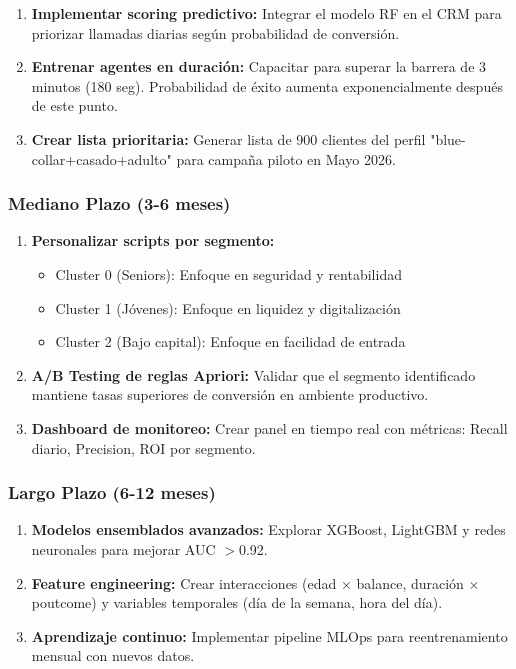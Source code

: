 \documentclass[12pt,letterpaper]{article}
\begin{document}
\begin{enumerate}
    \item \textbf{Implementar scoring predictivo:} Integrar el modelo RF en el CRM para priorizar llamadas diarias según probabilidad de conversión.
    
    \item \textbf{Entrenar agentes en duración:} Capacitar para superar la barrera de 3 minutos (180 seg). Probabilidad de éxito aumenta exponencialmente después de este punto.
    
    \item \textbf{Crear lista prioritaria:} Generar lista de 900 clientes del perfil "blue-collar+casado+adulto" para campaña piloto en Mayo 2026.
\end{enumerate}

\subsubsection{Mediano Plazo (3-6 meses)}

\begin{enumerate}
    \item \textbf{Personalizar scripts por segmento:}
    \begin{itemize}
        \item Cluster 0 (Seniors): Enfoque en seguridad y rentabilidad
        \item Cluster 1 (Jóvenes): Enfoque en liquidez y digitalización
        \item Cluster 2 (Bajo capital): Enfoque en facilidad de entrada
    \end{itemize}
    
    \item \textbf{A/B Testing de reglas Apriori:} Validar que el segmento identificado mantiene tasas superiores de conversión en ambiente productivo.
    
    \item \textbf{Dashboard de monitoreo:} Crear panel en tiempo real con métricas: Recall diario, Precision, ROI por segmento.
\end{enumerate}

\subsubsection{Largo Plazo (6-12 meses)}

\begin{enumerate}
    \item \textbf{Modelos ensemblados avanzados:} Explorar XGBoost, LightGBM y redes neuronales para mejorar AUC $>$0.92.
    
    \item \textbf{Feature engineering:} Crear interacciones (edad × balance, duración × poutcome) y variables temporales (día de la semana, hora del día).
    
    \item \textbf{Aprendizaje continuo:} Implementar pipeline MLOps para reentrenamiento mensual con nuevos datos.
\end{enumerate}
\end{document}
